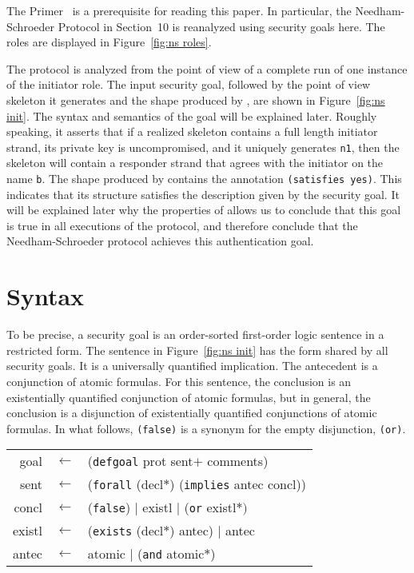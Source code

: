 \documentclass[12pt]{article}
\newcommand{\sym}[1]{\textup{\texttt{#1}}}
\begin{document}
The {\cpsa} Primer~\cite{cpsaprimer09} is a prerequisite for reading
this paper.  In particular, the Needham-Schroeder Protocol in
Section~10 is reanalyzed using security goals here.  The roles are
displayed in Figure~\ref{fig:ns roles}.

The protocol is analyzed from the point of view of a complete run of
one instance of the initiator role.  The input security goal, followed
by the point of view skeleton it generates and the shape produced by
{\cpsa}, are shown in Figure~\ref{fig:ns init}.  The syntax and
semantics of the goal will be explained later.  Roughly speaking, it
asserts that if a realized skeleton contains a full length initiator
strand, its private key is uncompromised, and it uniquely generates
\texttt{n1}, then the skeleton will contain a responder strand that
agrees with the initiator on the name \texttt{b}.  The shape produced
by {\cpsa} contains the annotation \texttt{(satisfies yes)}.  This
indicates that its structure satisfies the description given by the
security goal.  It will be explained later why the properties of
{\cpsa} allows us to conclude that this goal is true in all executions
of the protocol, and therefore conclude that the Needham-Schroeder
protocol achieves this authentication goal.

\section{Syntax}\label{sec:syntax}

To be precise, a security goal is an order-sorted first-order logic
sentence in a restricted form.  The sentence in Figure~\ref{fig:ns
  init} has the form shared by all security goals.  It is a
universally quantified implication.  The antecedent is a conjunction
of atomic formulas.  For this sentence, the conclusion is an
existentially quantified conjunction of atomic formulas, but in
general, the conclusion is a disjunction of existentially quantified
conjunctions of atomic formulas.  In what follows, \sym{(false)} is a
synonym for the empty disjunction, \sym{(or)}.

\begin{center}\scshape
  \begin{tabular}{rcl}
  goal&$\leftarrow$&(\sym{defgoal} prot sent$+$ comments)
  \\ sent&$\leftarrow$&(\sym{forall} (decl$\ast$) (\sym{implies} antec concl))
  \\ concl&$\leftarrow$&(\sym{false})
  $\mid$ existl $\mid$ (\sym{or} existl$\ast)$
  \\ existl&$\leftarrow$&(\sym{exists}
  (decl$\ast$) antec) $\mid$ antec
  \\ antec&$\leftarrow$&atomic $\mid$ (\sym{and} atomic$\ast$)
  \end{tabular}
\end{center}
\end{document}
